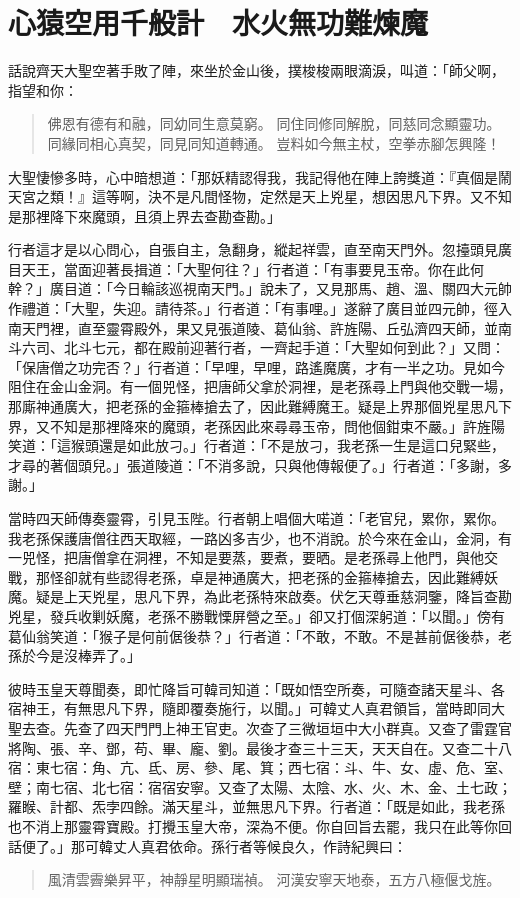
\chapter{心猿空用千般計　水火無功難煉魔}

話說齊天大聖空著手敗了陣，來坐於金山後，撲梭梭兩眼滴淚，叫道：「師父啊，指望和你：
\begin{quote}
佛恩有德有和融，同幼同生意莫窮。
同住同修同解脫，同慈同念顯靈功。
同緣同相心真契，同見同知道轉通。
豈料如今無主杖，空拳赤腳怎興隆！
\end{quote}

大聖悽慘多時，心中暗想道：「那妖精認得我，我記得他在陣上誇獎道：『真個是鬧天宮之類！』這等啊，決不是凡間怪物，定然是天上兇星，想因思凡下界。又不知是那裡降下來魔頭，且須上界去查勘查勘。」

行者這才是以心問心，自張自主，急翻身，縱起祥雲，直至南天門外。忽擡頭見廣目天王，當面迎著長揖道：「大聖何往？」行者道：「有事要見玉帝。你在此何幹？」廣目道：「今日輪該巡視南天門。」說未了，又見那馬、趙、溫、關四大元帥作禮道：「大聖，失迎。請待茶。」行者道：「有事哩。」遂辭了廣目並四元帥，徑入南天門裡，直至靈霄殿外，果又見張道陵、葛仙翁、許旌陽、丘弘濟四天師，並南斗六司、北斗七元，都在殿前迎著行者，一齊起手道：「大聖如何到此？」又問：「保唐僧之功完否？」行者道：「早哩，早哩，路遙魔廣，才有一半之功。見如今阻住在金山金洞。有一個兕怪，把唐師父拿於洞裡，是老孫尋上門與他交戰一場，那廝神通廣大，把老孫的金箍棒搶去了，因此難縛魔王。疑是上界那個兇星思凡下界，又不知是那裡降來的魔頭，老孫因此來尋尋玉帝，問他個鉗束不嚴。」許旌陽笑道：「這猴頭還是如此放刁。」行者道：「不是放刁，我老孫一生是這口兒緊些，才尋的著個頭兒。」張道陵道：「不消多說，只與他傳報便了。」行者道：「多謝，多謝。」

當時四天師傳奏靈霄，引見玉陛。行者朝上唱個大喏道：「老官兒，累你，累你。我老孫保護唐僧往西天取經，一路凶多吉少，也不消說。於今來在金山，金洞，有一兕怪，把唐僧拿在洞裡，不知是要蒸，要煮，要晒。是老孫尋上他門，與他交戰，那怪卻就有些認得老孫，卓是神通廣大，把老孫的金箍棒搶去，因此難縛妖魔。疑是上天兇星，思凡下界，為此老孫特來啟奏。伏乞天尊垂慈洞鑒，降旨查勘兇星，發兵收剿妖魔，老孫不勝戰慄屏營之至。」卻又打個深躬道：「以聞。」傍有葛仙翁笑道：「猴子是何前倨後恭？」行者道：「不敢，不敢。不是甚前倨後恭，老孫於今是沒棒弄了。」

彼時玉皇天尊聞奏，即忙降旨可韓司知道：「既如悟空所奏，可隨查諸天星斗、各宿神王，有無思凡下界，隨即覆奏施行，以聞。」可韓丈人真君領旨，當時即同大聖去查。先查了四天門門上神王官吏。次查了三微垣垣中大小群真。又查了雷霆官將陶、張、辛、鄧，苟、畢、龐、劉。最後才查三十三天，天天自在。又查二十八宿：東七宿：角、亢、氐、房、參、尾、箕；西七宿：斗、牛、女、虛、危、室、壁；南七宿、北七宿：宿宿安寧。又查了太陽、太陰、水、火、木、金、土七政；羅睺、計都、炁孛四餘。滿天星斗，並無思凡下界。行者道：「既是如此，我老孫也不消上那靈霄寶殿。打攪玉皇大帝，深為不便。你自回旨去罷，我只在此等你回話便了。」那可韓丈人真君依命。孫行者等候良久，作詩紀興曰：
\begin{quote}
風清雲霽樂昇平，神靜星明顯瑞禎。
河漢安寧天地泰，五方八極偃戈旌。
\end{quote}


